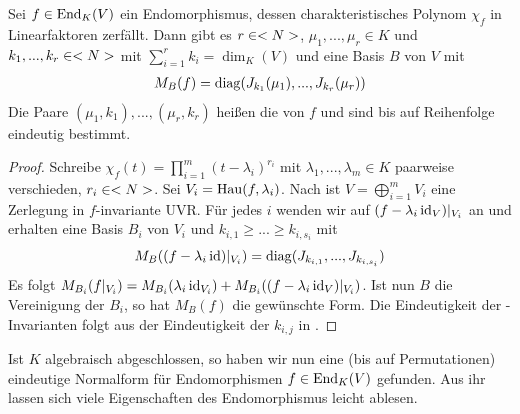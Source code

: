 \begin{theorem}
	Sei $f\in\operatorname{End}_K(V)$ ein Endomorphismus, dessen charakteristisches Polynom $\chi_f$ in Linearfaktoren zerfällt. Dann gibt es $r\in<N>$, $\mu_1,...,\mu_r\in K$ und $k_1,...,k_r\in <N>$ mit $\sum_{i=1}^r k_i=\dim_K(V)$ und eine Basis $B$ von $V$ mit
	\begin{align}
		M_B(f)=\operatorname{diag}(J_{k_1}(\mu_1),...,J_{k_r}(\mu_r))\notag
	\end{align} 
	Die Paare $(\mu_1,k_1),...,(\mu_r,k_r)$ heißen die  von $f$ und sind bis auf Reihenfolge eindeutig bestimmt.
\end{theorem}
\begin{proof}
	Schreibe $\chi_f(t)=\prod_{i=1}^m (t-\lambda_i)^{r_i}$ mit $\lambda_1,...,\lambda_m\in K$ paarweise verschieden, $r_i\in<N>$. Sei $V_i=\operatorname{Hau}(f,\lambda_i)$. Nach  ist $V=\bigoplus_{i=1}^m V_i$ eine Zerlegung in $f$-invariante UVR. Für jedes $i$ wenden wir  auf $(f-\lambda_i\operatorname{id}_V)\vert_{V_i}$ an und erhalten eine Basis $B_i$ von $V_i$ und $k_{i,1}\ge ...\ge k_{i,s_i}$ mit 
	\begin{align}
		M_B((f-\lambda_i\operatorname{id})\vert_{V_i})=\operatorname{diag}(J_{k_{i,1}},...,J_{k_{i,s_i}})\notag
	\end{align}
	Es folgt $M_{B_i}(f\vert_{V_i})=M_{B_i}(\lambda_i\operatorname{id}_{V_i})+M_{B_i}((f-\lambda_i\operatorname{id}_V)\vert_{V_i})$. Ist nun $B$ die Vereinigung der $B_i$, so hat $M_B(f)$ die gewünschte Form. Die Eindeutigkeit der -Invarianten folgt aus der Eindeutigkeit der $k_{i,j}$ in .
\end{proof}

\begin{remark}
	Ist $K$ algebraisch abgeschlossen, so haben wir nun eine (bis auf Permutationen) eindeutige Normalform für Endomorphismen $f\in\operatorname{End}_K(V)$ gefunden. Aus ihr lassen sich viele Eigenschaften des Endomorphismus leicht ablesen.
\end{remark}

